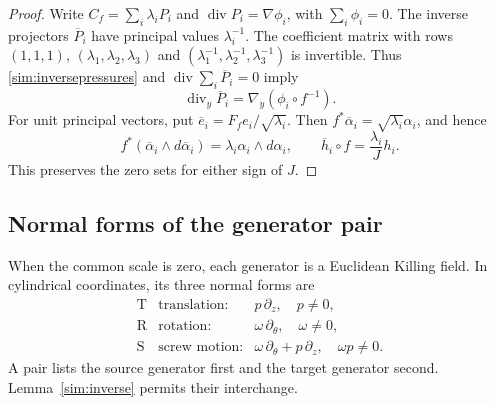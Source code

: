 \documentclass[11pt,a4paper]{article}
\numberwithin{equation}{section}
\theoremstyle{plain}
\theoremstyle{definition}
\theoremstyle{remark}
\begin{document}
\begin{proof}
Write $C_f=\sum_i\lambda_iP_i$ and
$\operatorname{div}P_i=\nabla\phi_i$, with $\sum_i\phi_i=0$.
The inverse projectors $\overline P_i$ have principal values
$\lambda_i^{-1}$. The coefficient matrix with rows
$(1,1,1)$, $(\lambda_1,\lambda_2,\lambda_3)$ and
$(\lambda_1^{-1},\lambda_2^{-1},\lambda_3^{-1})$ is invertible.
Thus \eqref{sim:inversepressures} and
$\operatorname{div}\sum_i\overline P_i=0$ imply
\begin{equation}\label{sim:labelpressures}
\operatorname{div}_y\overline P_i
=\nabla_y(\phi_i\circ f^{-1}).
\end{equation}
For unit principal vectors, put
$\overline e_i=F_fe_i/\sqrt{\lambda_i}$.
Then $f^*\overline\alpha_i=\sqrt{\lambda_i}\alpha_i$, and hence
\begin{equation}\label{sim:contacttransform}
f^*(\overline\alpha_i\wedge d\overline\alpha_i)
=\lambda_i\alpha_i\wedge d\alpha_i,
\qquad
\overline h_i\circ f=\frac{\lambda_i}{J}h_i.
\end{equation}
This preserves the zero sets for either sign of $J$.
\end{proof}

\subsection{Normal forms of the generator pair}

When the common scale is zero, each generator is a Euclidean
Killing field. In cylindrical coordinates, its three normal forms
are
\begin{equation}\label{sim:killingtypes}
\begin{array}{lll}
\mathrm T&\text{translation}:&p\,\partial_z,\quad p\ne0,\\
\mathrm R&\text{rotation}:&\omega\,\partial_\theta,\quad\omega\ne0,\\
\mathrm S&\text{screw motion}:&\omega\,\partial_\theta+p\,\partial_z,
\quad\omega p\ne0.
\end{array}
\end{equation}
A pair lists the source generator first and the target generator
second. Lemma~\ref{sim:inverse} permits their interchange.
\end{document}

